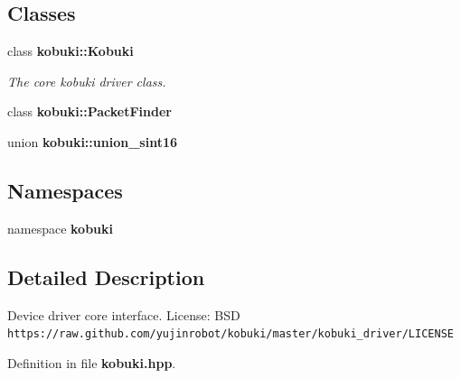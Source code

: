 \subsection*{\-Classes}
\begin{DoxyCompactItemize}
\item 
class {\bf kobuki\-::\-Kobuki}
\begin{DoxyCompactList}\small\item\em \-The core kobuki driver class. \end{DoxyCompactList}\item 
class {\bf kobuki\-::\-Packet\-Finder}
\item 
union {\bf kobuki\-::union\-\_\-sint16}
\end{DoxyCompactItemize}
\subsection*{\-Namespaces}
\begin{DoxyCompactItemize}
\item 
namespace {\bf kobuki}
\end{DoxyCompactItemize}


\subsection{\-Detailed \-Description}
\-Device driver core interface. \-License\-: \-B\-S\-D {\tt https\-://raw.\-github.\-com/yujinrobot/kobuki/master/kobuki\-\_\-driver/\-L\-I\-C\-E\-N\-S\-E} 

\-Definition in file {\bf kobuki.\-hpp}.

